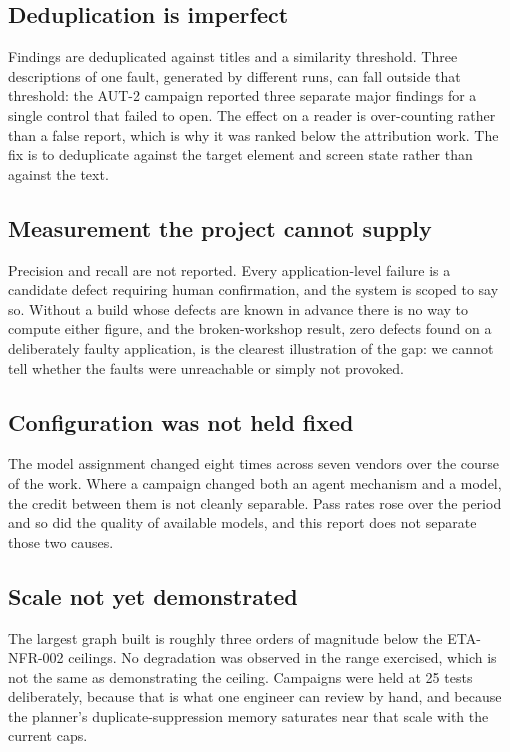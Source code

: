 \subsection{Deduplication is imperfect}

Findings are deduplicated against titles and a similarity threshold. Three
descriptions of one fault, generated by different runs, can fall outside that
threshold: the AUT-2 campaign reported three separate major findings for a
single control that failed to open. The effect on a reader is over-counting
rather than a false report, which is why it was ranked below the attribution
work. The fix is to deduplicate against the target element and screen state
rather than against the text.

\subsection{Measurement the project cannot supply}

Precision and recall are not reported. Every application-level failure is a
candidate defect requiring human confirmation, and the system is scoped to say
so. Without a build whose defects are known in advance there is no way to
compute either figure, and the broken-workshop result, zero defects found on a
deliberately faulty application, is the clearest illustration of the gap: we
cannot tell whether the faults were unreachable or simply not provoked.

\subsection{Configuration was not held fixed}

The model assignment changed eight times across seven vendors over the course of
the work. Where a campaign changed both an agent mechanism and a model, the
credit between them is not cleanly separable. Pass rates rose over the period
and so did the quality of available models, and this report does not separate
those two causes.

\subsection{Scale not yet demonstrated}

The largest graph built is roughly three orders of magnitude below the
ETA-NFR-002 ceilings. No degradation was observed in the range exercised, which
is not the same as demonstrating the ceiling. Campaigns were held at 25 tests
deliberately, because that is what one engineer can review by hand, and because
the planner's duplicate-suppression memory saturates near that scale with the
current caps.

